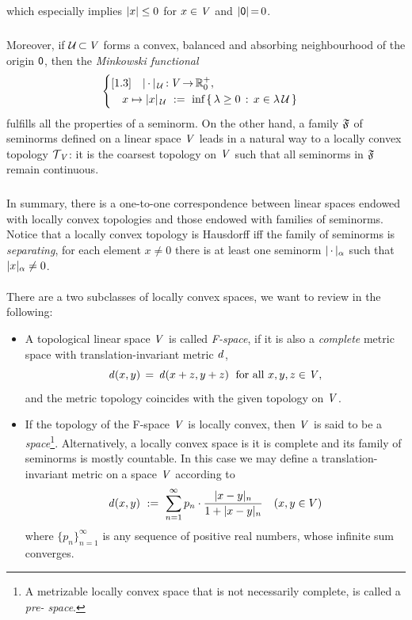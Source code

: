 \documentclass[11pt,twoside]{article}
\begin{document}
which especially implies $\abs{x} \leq 0$ for $x \in \mathit{V}$ and $\abs{\0} \eq 0$.

\subparagraph{} %
Moreover,
if $\mathcal{U} {\,\subset\,} \mathit{V}$ forms a convex, balanced and absorbing neighbourhood
of the origin ${\mathsf{0}}$,
then the \textit{Minkowski functional}
\[
\begin{cases}[1.3]
\quad \abs{\,\cdot\,} _{\,\U}\:\vecV \xto \R_0^+,\\
\quad x \mapsto \abs{x} _{\,\U} \, \eqdef \,
\mbox{inf} \, \set{\lambda \geq 0}{ x \in \lambda \, \U} \\
\end{cases}
\]
fulfills all the properties of a seminorm.
On the other hand,
a family $\mathfrak{F}$ of seminorms defined on a linear space $\mathit{V}$
leads in a natural way to a locally convex topology $\mathcal{T}_{\,\mathit{V}}$:
it is the coarsest topology on $\mathit{V}$
such that all seminorms in $\mathfrak{F}$ remain continuous.

\subparagraph{}
In summary,
there is a one-to-one correspondence
between linear spaces endowed with locally convex topologies
and those endowed with families of seminorms.
Notice that a locally convex topology is Hausdorff
iff
the family of seminorms is \textit{separating},
{\ie} for each element $x \neq 0$
there is at least one seminorm $\abs{\,\cdot\,} _{\alpha}$
such that $\abs{x} _{\alpha} \neq 0$.

\paragraph{} %
There are a two subclasses of locally convex spaces,
we want to review in the following:

\begin{itemize}[leftmargin=4mm]
\item[1.]
A topological linear space $\mathit{V}$ is called \textit{F-space},
if it is also a \textit{complete} metric space with translation-invariant
metric $\mathit{d}$,
{\ie}
\[
\mathit{d}(x,y) \,=\, \mathit{d}(x+z,y+z) \; \mbox{ for all } x,y,z \in \mathit{V},
\]
and the metric topology coincides with the given topology on $\mathit{V}$.

\item[2.]
If the topology of the F-space $\mathit{V}$ is locally convex,
then $\mathit{V}$ is said to be a \textit{{\FRECHET} space}\footnote{
A metrizable locally convex space that is not necessarily complete,
is called a \textit{pre-{\FRECHET} space}.}.
Alternatively,
a locally convex space is {\FRECHET}
\iff
it is complete and its family of seminorms is mostly countable.
In this case
we may define a translation-invariant metric on a {\FRECHET} space $\mathit{V}$
according to
\[
\d(x,y) \, \eqdef \,
\sum_{n=1}^{\infty} p_n \cdot \frac{\abs{x-y} _n}{1+ \abs{x-y} _n}
\quad (x,y \in \topV)
\]
where $\{p_n\}_{n=1}^{\infty}$ is any sequence of positive real numbers,
whose infinite sum converges.
\end{itemize}
\end{document}
